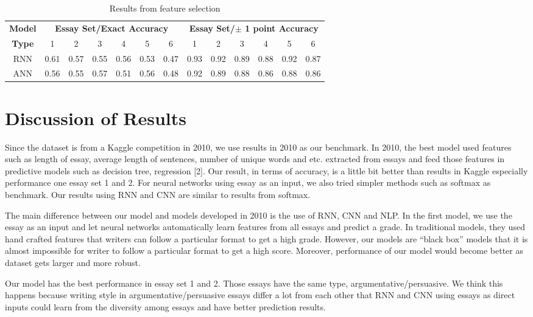 \documentclass[11pt,conference]{IEEEtran}
\begin{document}
\begin{table}[htbp]
\caption{Results from feature selection}
\begin{center}
\begin{tabular}{|c|c|c|c|c|c|c|c|c|c|c|c|c|}
\hline

\textbf{Model} &\multicolumn{6}{|c|}{\textbf{Essay Set/Exact Accuracy}} &\multicolumn{6}{|c|}{\textbf{Essay Set/$\pm$ 1 point Accuracy}} \\
\cline{2-7} 
\cline{8-13} 
\textbf{Type}&1 &2&3&4&5&6&1 &2&3&4&5&6\\
\hline
RNN&0.61&0.57&0.55&0.56&0.53&0.47& 0.93&0.92&0.89&0.88&0.92&0.87\\
\hline
ANN&0.56&0.55&0.57&0.51&0.56&0.48&0.92&0.89&0.88&0.86&0.88&0.86\\
\hline
\end{tabular}
\label{tab1}
\end{center}
\end{table}

\section{Discussion of Results}

Since the dataset is from a Kaggle competition in 2010, we use results in 2010 as our benchmark. In 2010, the best model used features such as length of essay, average length of sentences, number of unique words and etc. extracted from essays and feed those features in predictive models such as decision tree, regression [2]. Our result, in terms of accuracy, is a little bit better than results in Kaggle especially performance one essay set 1 and 2. For neural networks using essay as an input, we also tried simpler methods such as softmax as benchmark. Our results using RNN and CNN are similar to results from softmax.

The main difference between our model and models developed in 2010 is the use of RNN, CNN and NLP. In the first model, we use the essay as an input and let neural networks automatically learn features from all essays and predict a grade. In traditional models, they used hand crafted features that writers can follow a particular format to get a high grade. However, our models are ``black box'' models that it is almost impossible for writer to follow a particular format to get a high score. Moreover, performance of our model would become better as dataset gets larger and more robust. 

Our model has the best performance in essay set 1 and 2. Those essays have the same type, argumentative/persuasive. We think this happens because writing style in argumentative/persuasive essays differ a lot from each other that RNN and CNN using essays as direct inputs could learn from the diversity among essays and have better prediction results. 
\end{document}
